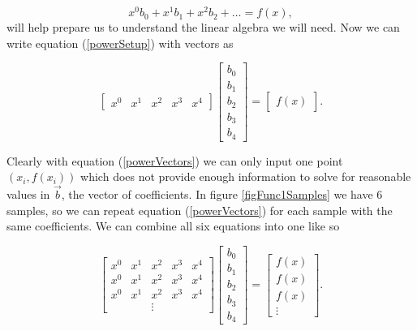 \begin{equation} \label{powerSetup}
x^0b_0 + x^1b_1 + x^2b_2 + \ldots = f(x),
\end{equation}
will help prepare us to understand the linear algebra we will need. Now we can write equation (\ref{powerSetup}) with vectors as

\begin{equation} \label{powerVectors}
\begin{bmatrix}
x^0 & x^1 & x^2 & x^3 & x^4
\end{bmatrix}
\begin{bmatrix}
b_0 \\
b_1 \\
b_2 \\
b_3 \\
b_4 
\end{bmatrix}
=
\begin{bmatrix}
f(x)
\end{bmatrix} .
\end{equation}

\par Clearly with equation (\ref{powerVectors}) we can only input one point $(x_i,f(x_i))$ which does not provide enough information to solve for reasonable values in $\vec{b}$, the vector of coefficients. In figure \ref{figFunc1Samples} we have 6 samples, so we can repeat equation (\ref{powerVectors}) for each sample with the same coefficients. We can combine all six equations into one like so

\begin{equation} \label{LinAlgGeneral}
\begin{bmatrix}
x^0 & x^1 & x^2 & x^3 & x^4 \\
x^0 & x^1 & x^2 & x^3 & x^4 \\
x^0 & x^1 & x^2 & x^3 & x^4 \\
& & \vdots & &
\end{bmatrix}
\begin{bmatrix}
b_0 \\
b_1 \\
b_2 \\
b_3 \\
b_4 
\end{bmatrix}
=
\begin{bmatrix}
f(x) \\ 
f(x) \\
f(x) \\ 
\vdots
\end{bmatrix} .
\end{equation}

